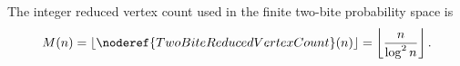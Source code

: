 \begin{definition}
The integer reduced vertex count used in the finite two-bite probability space is
\[
M(n)=\left\lfloor \noderef{TwoBiteReducedVertexCount}(n)\right\rfloor
=\left\lfloor \frac{n}{\log^2 n}\right\rfloor .
\]
\end{definition}
